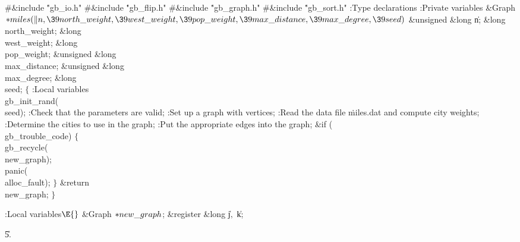 \Y\B\8\#\&{include} \.{"gb\_io.h"}\6
\8\#\&{include} \.{"gb\_flip.h"}\6
\8\#\&{include} \.{"gb\_graph.h"}\6
\8\#\&{include} \.{"gb\_sort.h"}\6
\ATH\7
:Type declarations\X\6
:Private variables\X\7
\1\1\&{Graph} ${}{*}\\{miles}(\|n,\39\\{north\_weight},\39\\{west\_weight},\39%
\\{pop\_weight},\39\\{max\_distance},\39\\{max\_degree},\39\\{seed}){}$\6
\&{unsigned} \&{long} \|n;\6
\&{long} \\{north\_weight};%
\6
\&{long} \\{west\_weight};%
\6
\&{long} \\{pop\_weight};%
\6
\&{unsigned} \&{long} \\{max\_distance};\6
\&{unsigned} \&{long} \\{max\_degree};\6
\&{long} \\{seed};\2\2\6
${}\{{}$\5
\1:Local variables\X\7
\\{gb\_init\_rand}(\\{seed});\6
:Check that the parameters are valid\X;\6
:Set up a graph with  vertices\X;\6
:Read the data file \.{miles.dat} and compute city weights\X;\6
:Determine the  cities to use in the graph\X;\6
:Put the appropriate edges into the graph\X;\6
\&{if} (\\{gb\_trouble\_code})\5
${}\{{}$\1\6
\\{gb\_recycle}(\\{new\_graph});\6
\\{panic}(\\{alloc\_fault});\6
\4${}\}{}$\2\6
\&{return} \\{new\_graph};\6
\4${}\}{}$\2\par
\fi

\B{}:Local variables\X${}\E{}$\6
\&{Graph} ${}{*}\\{new\_graph}{}$;%
\6
\&{register} \&{long} \|j${},{}$ \|k;\par
\U5.\fi

